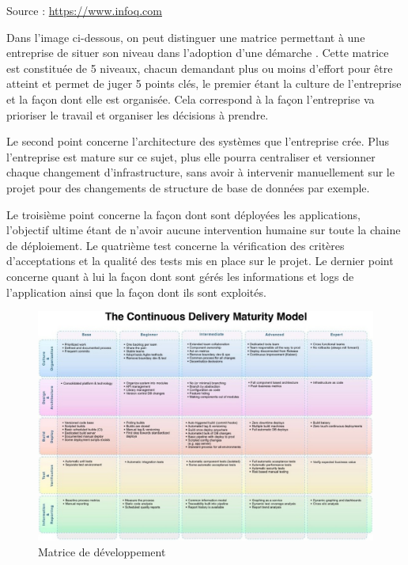 \begin{normalsize}
Source : \url{https://www.infoq.com}

Dans l'image ci-dessous, on peut distinguer une matrice permettant à une entreprise de situer son niveau dans l'adoption d'une démarche \devops. Cette matrice est constituée de 5 niveaux, chacun demandant plus ou moins d'effort pour être atteint et permet de juger 5 points clés, le premier étant la culture de l'entreprise et la façon dont elle est organisée. Cela correspond à la façon l'entreprise va prioriser le travail et organiser les décisions à prendre.

Le second point concerne l'architecture des systèmes que l'entreprise crée. Plus l'entreprise est mature sur ce sujet, plus elle pourra centraliser et versionner chaque changement d'infrastructure, sans avoir à intervenir manuellement sur le projet pour des changements de structure de base de données par exemple. 

Le troisième point concerne la façon dont sont déployées les applications, l'objectif ultime étant de n'avoir aucune intervention humaine sur toute la chaine de déploiement. Le quatrième test concerne la vérification des critères d'acceptations et la qualité des tests mis en place sur le projet. Le dernier point concerne quant à lui la façon dont sont gérés les informations et logs de l'application ainsi que la façon dont ils sont exploités.
\end{normalsize}

\begin{figure}[ht]
	\centering
	\includegraphics[scale=0.62,angle=-90]{img/devops-matrice.jpg}
	\caption{Matrice de développement \devops}
	\label{annexe:devops-matrice}
\end{figure}

